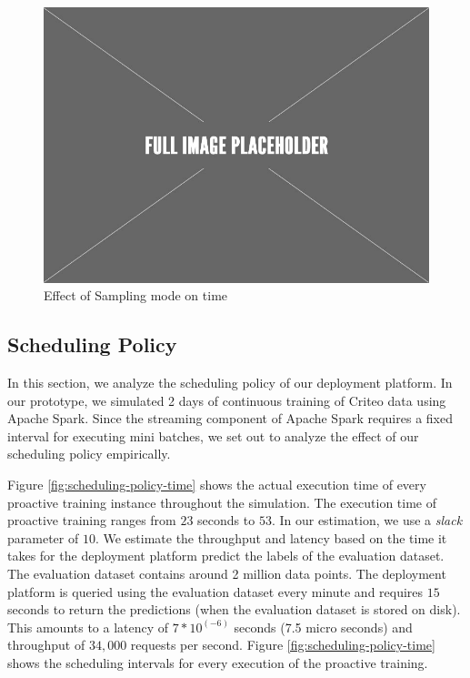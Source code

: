 \begin{figure}[h!]
\centering
\includegraphics[width=\columnwidth]{../images/placeholder.jpeg}
\caption{Effect of Sampling mode on time}
\label{fig:sampling-mode-time}
\vspace{2mm}
\end{figure}

\subsection{Scheduling Policy}
In this section, we analyze the scheduling policy of our deployment platform.
In our prototype, we simulated 2 days of continuous training of Criteo data using Apache Spark.
Since the streaming component of Apache Spark requires a fixed interval for executing mini batches, we set out to analyze the effect of our scheduling policy empirically.

Figure \ref{fig:scheduling-policy-time} shows the actual execution time of every proactive training instance throughout the simulation.
The execution time of proactive training ranges from $23$ seconds to $53$.
In our estimation, we use a \textit{slack} parameter of $10$.
We estimate the throughput and latency based on the time it takes for the deployment platform predict the labels of the evaluation dataset.
The evaluation dataset contains around 2 million data points.
The deployment platform is queried using the evaluation dataset every minute and requires $15$ seconds to return the predictions (when the evaluation dataset is stored on disk). 
This amounts to a latency of $7 * 10 ^ {(-6)}$ seconds (7.5 micro seconds) and throughput of $34,000$ requests per second.
Figure \ref{fig:scheduling-policy-time}  shows the scheduling intervals for every execution of the proactive training.

